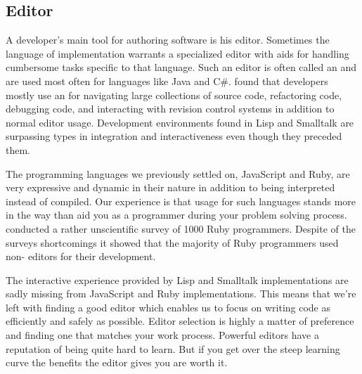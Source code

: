 \subsection{Editor}

A developer's main tool for authoring software is his editor. Sometimes the
language of implementation warrants a specialized editor with aids for
handling cumbersome tasks specific to that language. Such an editor is often
called an %
and are used most often for languages like Java and C\#.
\citet{murphy06} found that developers mostly use an  for navigating
large collections of source code, refactoring code, debugging code, and
interacting with revision control systems in addition to normal editor usage.
Development environments found in Lisp%
and Smalltalk%
are surpassing  types in integration and interactiveness even though
they preceded them.

The programming languages we previously settled on, JavaScript and Ruby,
are very expressive and dynamic in their nature in addition to being
interpreted instead of compiled. Our experience is that  usage for
such languages stands more in the way than aid you as a programmer during
your problem solving process.
\citet{bray07} conducted a rather unscientific survey of 1000 Ruby
programmers. Despite of the surveys shortcomings it showed that
the majority of Ruby programmers used non- editors for their
development.

The interactive experience provided by Lisp and Smalltalk implementations are
sadly missing%
from JavaScript and Ruby implementations. This means that we're left with
finding a good editor which enables us to focus on writing code as efficiently
and safely as possible. Editor selection is highly a matter of preference and
finding one that matches your work process. Powerful editors have a
reputation of being quite hard to learn. But if you get over the steep
learning curve the benefits the editor gives you are worth it.

